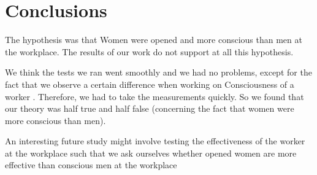 \section{Conclusions}\label{Sec:Conc}
The  hypothesis was that Women were opened and more conscious than men at the workplace. The  results of our work  do not  support at all this hypothesis.

We think the tests we ran went  smoothly and we had no problems, except for the fact that we observe a certain difference when working on Consciousness of a worker . Therefore, we had to take the measurements quickly. So we found that our theory was half true and half false (concerning the fact that women were more conscious than men).

An interesting future study might involve testing the effectiveness of the worker at the workplace such that we ask ourselves whether opened women are more effective than conscious men at the workplace







 
  

